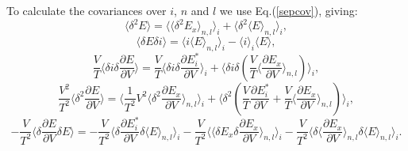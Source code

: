 To calculate the covariances over $i$, $n$ and $l$ we use Eq.(\ref{sepcov}), giving:
\begin{equation}
\langle \delta^2 E \rangle =
\langle \langle \delta^2 E_x \rangle_{n,l} \rangle_i +
\langle \delta^2 \langle E \rangle_{n,l} \rangle_i,
\end{equation}
\begin{equation}
\langle \delta E \delta i \rangle = \langle i \langle E \rangle_{n,l} \rangle_i -
\langle i \rangle_i \langle E \rangle,
\end{equation}
\begin{equation}
\frac{V}{T} \langle \delta i \delta \frac{\partial E}{\partial V} \rangle =
\frac{V}{T} \langle \delta i \delta \frac{\partial E^*_i}{\partial V} \rangle_i +
\langle \delta i \delta(\frac{V}{T} \langle \frac{\partial E_x}{\partial V} \rangle_{n,l}) \rangle_i,
\end{equation}
\begin{equation}
\frac{V^2}{T^2} \langle \delta^2 \frac{\partial E}{\partial V} \rangle =
\langle \frac{1}{T^2} V^2 \langle \delta^2 \frac{\partial E_x}{\partial V} \rangle_{n,l} \rangle_i +
\langle \delta^2 (\frac{V}{T} \frac{\partial E^*_i}{\partial V} +
\frac{V}{T} \langle \frac{\partial E_x}{\partial V} \rangle_{n,l}) \rangle_i,
\end{equation}
\begin{equation}
-\frac{V}{T^2} \langle \delta \frac{\partial E}{\partial V} \delta E \rangle =
-\frac{V}{T^2} \langle \delta \frac{\partial E^*_i}{\partial V} \delta \langle E \rangle_{n,l} \rangle_i -
\frac{V}{T^2} \langle \langle \delta E_x \delta \frac{\partial E_x}{\partial V} \rangle_{n,l} \rangle_i -
\frac{V}{T^2} \langle \delta \langle \frac{\partial E_x}{\partial V} \rangle_{n,l} \delta \langle E \rangle_{n,l} \rangle_i.
\end{equation}

